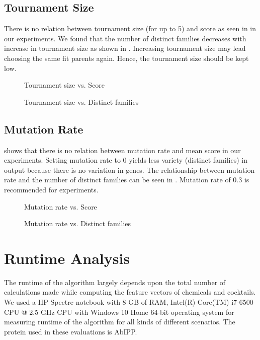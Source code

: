 \subsection{Tournament Size} \label{sec:results-tournament}
There is no relation between tournament size (for up to 5) and score as seen in  in our experiments.
We found that the number of distinct families decreases with increase in tournament size as shown in . Increasing tournament size may lead choosing the same fit parents again. Hence, the tournament size should be kept low.


\begin{figure}[H]
	\caption{Tournament size vs. Score}
	\label{fig:tvs}
\end{figure}

\begin{figure}[H]
	\caption{Tournament size vs. Distinct families}
	\label{fig:tvd}
\end{figure}

\subsection{Mutation Rate} \label{sec:results-mutation}

 shows that there is no relation between mutation rate and mean score in our experiments. Setting mutation rate to 0 yields less variety (distinct families) in output because there is no variation in genes. The relationship between mutation rate and the number of distinct families can  be seen in . Mutation rate of 0.3 is recommended for experiments.

\begin{figure}[H]
	\caption{Mutation rate vs. Score}
	\label{fig:mvs}
\end{figure}

\begin{figure}[H]
	\caption{Mutation rate vs. Distinct families}
	\label{fig:mvd}
\end{figure}


\section{Runtime Analysis} \label{sec:results-runtime}

The runtime of the algorithm largely depends upon the total number of calculations made while computing the feature vectors of chemicals and cocktails. We used a HP Spectre notebook with 8 GB of RAM, Intel(R) Core(TM) i7-6500 CPU @ 2.5 GHz CPU with Windows 10 Home 64-bit operating system for measuring runtime of the algorithm for all kinds of different scenarios. The protein used in these evaluations is AbIPP.

